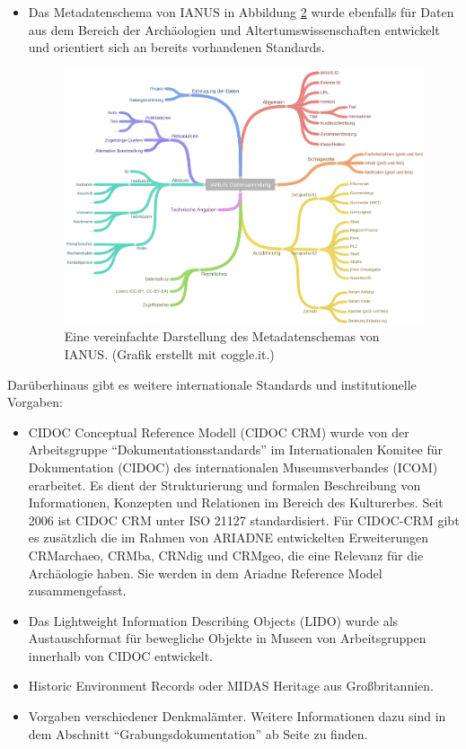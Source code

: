 \begin{itemize}
\begin{figure}[h!tb]
\begin{center}
		\end{center}
		\caption{CARARE 2.0. (Grafik erstellt mit coggle.it.)}
		\label{abb:doku_CARARE}
\end{figure}
\item Das Metadatenschema von IANUS in Abbildung \ref{abb:doku_IANUS} wurde ebenfalls für Daten aus dem Bereich der Archäologien und Altertumswissenschaften entwickelt und orientiert sich an bereits vorhandenen Standards.
\begin{figure}[h!bt]
		\begin{center}
			\includegraphics[width=\textwidth]{bilder/doku_IANUS}
		\end{center}
		\caption{Eine vereinfachte Darstellung des Metadatenschemas von IANUS. (Grafik erstellt mit coggle.it.)}
		\label{abb:doku_IANUS}
\end{figure}
\end{itemize}

Darüberhinaus gibt es weitere internationale Standards und institutionelle Vorgaben:
\begin{itemize}
	\item CIDOC Conceptual Reference Modell (CIDOC CRM) wurde von der Arbeitsgruppe "`Dokumentationsstandards"' im Internationalen Komitee für Dokumentation (CIDOC) des internationalen Museumsverbandes (ICOM) erarbeitet. Es dient der Strukturierung und formalen Beschreibung von Informationen, Konzepten und Relationen im Bereich des Kulturerbes. Seit 2006 ist CIDOC CRM unter ISO 21127 standardisiert. Für CIDOC-CRM gibt es zusätzlich die im Rahmen von ARIADNE entwickelten Erweiterungen CRMarchaeo, CRMba, CRNdig und CRMgeo, die eine Relevanz für die Archäologie haben. Sie werden in dem Ariadne Reference Model zusammengefasst.
	\item Das Lightweight Information Describing Objects (LIDO) wurde als Austauschformat für bewegliche Objekte in Museen von Arbeitsgruppen innerhalb von CIDOC entwickelt.
	\item Historic Environment Records oder MIDAS Heritage aus Großbritannien.
	\item Vorgaben verschiedener Denkmalämter. Weitere Informationen dazu sind in dem Abschnitt "`Grabungsdokumentation"' ab Seite \pageref{grabungsdokumentation} zu finden.
\end{itemize}



